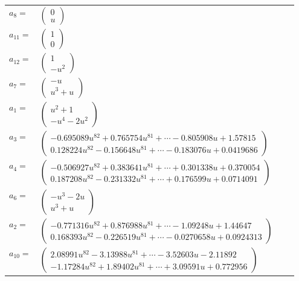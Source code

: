 \documentclass[1p]{elsarticle_modified}
\theoremstyle{definition}
\begin{document}
\begin{tabular}{m{7pt} m{180pt} m{7pt} m{180pt} }
\flushright $a_{8}=$&$\begin{pmatrix}0\\u\end{pmatrix}$ \\
\flushright $a_{11}=$&$\begin{pmatrix}1\\0\end{pmatrix}$ \\
\flushright $a_{12}=$&$\begin{pmatrix}1\\- u^2\end{pmatrix}$ \\
\flushright $a_{7}=$&$\begin{pmatrix}- u\\u^3+u\end{pmatrix}$ \\
\flushright $a_{1}=$&$\begin{pmatrix}u^2+1\\- u^4-2 u^2\end{pmatrix}$ \\
\flushright $a_{3}=$&$\begin{pmatrix}-0.695089 u^{82}+0.765754 u^{81}+\cdots-0.805908 u+1.57815\\0.128224 u^{82}-0.156648 u^{81}+\cdots-0.183076 u+0.0419686\end{pmatrix}$ \\
\flushright $a_{4}=$&$\begin{pmatrix}-0.506927 u^{82}+0.383641 u^{81}+\cdots+0.301338 u+0.370054\\0.187208 u^{82}-0.231332 u^{81}+\cdots+0.176599 u+0.0714091\end{pmatrix}$ \\
\flushright $a_{6}=$&$\begin{pmatrix}- u^3-2 u\\u^3+u\end{pmatrix}$ \\
\flushright $a_{2}=$&$\begin{pmatrix}-0.771316 u^{82}+0.876988 u^{81}+\cdots-1.09248 u+1.44647\\0.168393 u^{82}-0.226519 u^{81}+\cdots-0.0270658 u+0.0924313\end{pmatrix}$ \\
\flushright $a_{10}=$&$\begin{pmatrix}2.08991 u^{82}-3.13988 u^{81}+\cdots-3.52603 u-2.11892\\-1.17284 u^{82}+1.89402 u^{81}+\cdots+3.09591 u+0.772956\end{pmatrix}$ \\

\end{tabular}
\end{document}
